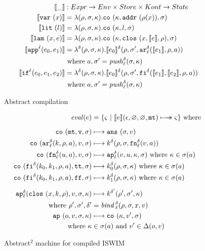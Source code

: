 \documentclass[preprint,onecolumn,9pt]{sigplanconf} %
\begin{document}
\begin{figure}
\begin{align*}
\compile{\_} &: Expr \to Env \times Store \times Kont \to State \\
\compile{\svar\mvar} &= \lambda(\menv,\msto,\mkont) .\co{\mkont,\saddr{\menv(\mvar)},\msto}
\\
\compile{\slit\mlit} &= \lambda(\menv,\msto,\mkont) .
\co{\mkont,\mlit,\msto}
\\
\compile{\slam\mvar\mexp} &= \lambda(\menv,\msto,\mkont) .
\co{\mkont,\clos{\mvar,\compile\mexp,\menv},\msto}
\\
\compile{\sapp[^\mlab]{\mexpi0}{\mexpi1}} &= \lambda^\mcntr(\menv,\msto,\mkont) .
\compile{\mexpi0}^\mcntr(\menv,\msto',\kar[_\mlab^\mcntr]{\compile{\mexpi1},\menv,\maddr})
\\
&
\text{ where }\maddr,\msto' = \mathit{push}^\mcntr_\mlab(\msto,\mkont)
\\
\compile{\sif[^\mlab]{\mexpi0}{\mexpi1}{\mexpi2}} &= \lambda^\mcntr(\menv,\msto,\mkont) .
\compile{\mexpi0}^\delta(\menv,\msto',\kif[^\mcntr]{\compile{\mexpi1},\compile{\mexpi2},\menv,\maddr})
\\
&\text{ where }\maddr,\msto' = \mathit{push}_\mlab^\mcntr(\msto,\mkont)
\end{align*}
\caption{Abstract compilation}
\label{fig:compile}
\end{figure}

\begin{figure}
\begin{align*}
\mathit{eval}(\mexp) &= \{ \mstate\ |\ \compile{\mexp}(\epsilon,\varnothing,\varnothing,\kmt) \multimachstep \mstate \} \text{ where }
\\[2mm]
\co{\kmt,\mval,\msto} &\machstep
\ans{\msto,\mval}
\\
\co{\kar[^\mcntr_\mlab]{\mcomp,\menv,\maddr},\mval,\msto} & \machstep
\mcomp^\mcntr(\menv,\msto,\kfn[^\mcntr_\mlab]{\mval,\maddr})
\\
\co{\kfn[^\mcntr_\mlab]{{\mvalx{u}},\maddr},\mval,\msto} & \machstep
\ap[^\mcntr_\mlab]{\mval,\mvalx{u},\mkont,\msto}
\text{ where }\mkont \in \msto(\maddr)
\\
\co{\kif[^\mcntr]{\mcompi0,\mcompi1,\menv,\maddr},\strue,\msto} & \machstep
\mcompi0^\mcntr(\menv,\msto,\mkont)
\text{ where }\mkont\in\msto(\maddr)
\\
\co{\kif[^\mcntr]{\mcompi0,\mcompi1,\menv,\maddr},\sfalse,\msto} & \machstep
\mcompi1^\mcntr(\menv,\msto,\mkont)
\text{ where }\mkont\in\msto(\maddr)
\\[2mm]
\ap[^\mcntr_\mlab]{\clos{\mvar,\mcomp,\menv},\mval,\msto,\mkont} & \machstep
\mcomp^{\mcntr'}(\menv',\msto',\mkont) \\
\text{ where }\menv',\msto',\mcntr' &= \mathit{bind\,}^{ \mcntr}_\mlab(\menv,\msto,\mvar,\mval)
\\
\ap{\mop,\mval,\msto,\mkont} & \machstep
\co{\mkont,\mval',\msto} \\
\text{ where }\mkont &\in\msto(\maddr)
\text{ and } \mval'\in\interpdelta(\mop,\mval)
\end{align*}
\caption{Abstract$^2$ machine for compiled ISWIM}
\label{fig:caam}
\end{figure}
\end{document}
